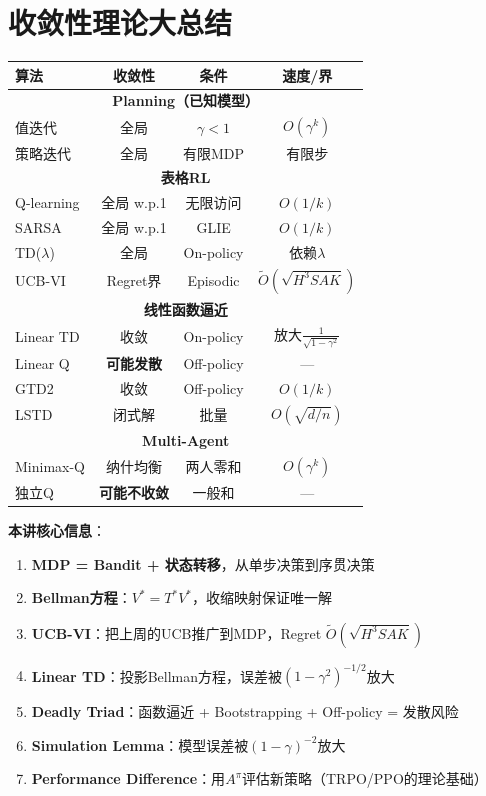 \documentclass[11pt,a4paper]{article}
\theoremstyle{definition}
\begin{document}
\section{收敛性理论大总结}

\begin{center}
\begin{tabular}{l|c|c|c}
\toprule
算法 & 收敛性 & 条件 & 速度/界 \\
\midrule
\multicolumn{4}{c}{\textbf{Planning（已知模型）}} \\
\midrule
值迭代 & 全局 & $\gamma < 1$ & $O(\gamma^k)$ \\
策略迭代 & 全局 & 有限MDP & 有限步 \\
\midrule
\multicolumn{4}{c}{\textbf{表格RL}} \\
\midrule
Q-learning & 全局 w.p.1 & 无限访问 & $O(1/k)$ \\
SARSA & 全局 w.p.1 & GLIE & $O(1/k)$ \\
TD($\lambda$) & 全局 & On-policy & 依赖$\lambda$ \\
UCB-VI & Regret界 & Episodic & $\tilde{O}(\sqrt{H^3SAK})$ \\
\midrule
\multicolumn{4}{c}{\textbf{线性函数逼近}} \\
\midrule
Linear TD & 收敛 & On-policy & 放大$\frac{1}{\sqrt{1-\gamma^2}}$ \\
Linear Q & \textbf{可能发散} & Off-policy & — \\
GTD2 & 收敛 & Off-policy & $O(1/k)$ \\
LSTD & 闭式解 & 批量 & $O(\sqrt{d/n})$ \\
\midrule
\multicolumn{4}{c}{\textbf{Multi-Agent}} \\
\midrule
Minimax-Q & 纳什均衡 & 两人零和 & $O(\gamma^k)$ \\
独立Q & \textbf{可能不收敛} & 一般和 & — \\
\bottomrule
\end{tabular}
\end{center}

\begin{magicbox}
\textbf{本讲核心信息}：
\begin{enumerate}
    \item \textbf{MDP = Bandit + 状态转移}，从单步决策到序贯决策
    \item \textbf{Bellman方程}：$V^* = T^* V^*$，收缩映射保证唯一解
    \item \textbf{UCB-VI}：把上周的UCB推广到MDP，Regret $\tilde{O}(\sqrt{H^3SAK})$
    \item \textbf{Linear TD}：投影Bellman方程，误差被$(1-\gamma^2)^{-1/2}$放大
    \item \textbf{Deadly Triad}：函数逼近 + Bootstrapping + Off-policy = 发散风险
    \item \textbf{Simulation Lemma}：模型误差被$(1-\gamma)^{-2}$放大
    \item \textbf{Performance Difference}：用$A^\pi$评估新策略（TRPO/PPO的理论基础）
\end{enumerate}
\end{magicbox}
\end{document}
